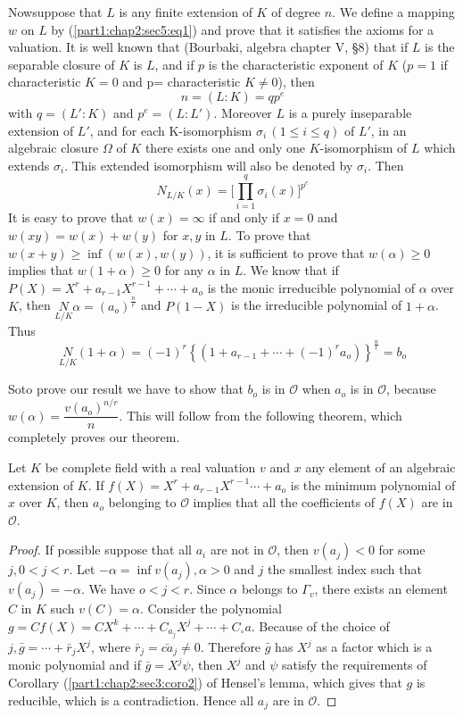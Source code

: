 Now\pageoriginale suppose that $L$ is any finite extension of $K$ of degree $n$. We
define a mapping $w$ on $L$ by (\ref{part1:chap2:sec5:eq1}) and prove that it satisfies the
axioms for a valuation. It is well known that (Bourbaki, algebra
chapter V, \S 8) that if $L$ is the separable closure of $K$ is $L$,
and if $p$ is the characteristic exponent of $K$ (\iec  $p=1$ if
characteristic $K = 0$ and p= characteristic $K \neq 0 $), then 
 $$
n= (L:  K) = q p^e
$$
with $q=(L':  K)$ and $p^e = (L:  L')$. Moreover $L$ is a purely
inseparable extension of $L'$, and for each K-isomorphism $\sigma_i\, (1
\leq i \leq q)$ of $L'$, in an algebraic closure $\Omega$ of $K$ there
exists one and only one $K$-isomorphism of $L$ which extends
$\sigma_i$. This extended isomorphism will also be denoted by
$\sigma_i$. Then 
$$
N_{L/K}(x) =\bigg[\prod\limits^{q}_{i=1} \sigma_i (x) \bigg]^{p^e}
$$
It is easy to prove that $w(x)=\infty$ if and only if $x=0$ and $w(xy)
= w(x) + w(y)$ for $x, y$ in $L$. To prove that $w(x+y) \geq \inf
(w(x), w(y))$, it is sufficient to prove that $w(\alpha ) \geq 0$
implies that $w(1 + \alpha ) \geq 0$ for any $\alpha $ in $L$. We know
that if $P(X) = X^r + a_{r-1}X^{r-1} + \cdots + a_o$ is the monic
irreducible polynomial of $\alpha$ over $K$, then $\underset{L / K} N
\alpha = (a_o)^{\frac{n}{r}}$ and $P(1-X)$ is the irreducible
polynomial of $1+\alpha $. Thus 
$$
\underset{L / K}{N} (1 + \alpha ) = (-1)^r \left\{(1 + a_{r-1} + \cdots +
(-1)^r a_o) \right\}^{\frac {n} {r} } = b_o 
$$

So\pageoriginale to prove our result we have to show that $b_o$ is in
$\mathscr{O}$ 
when $a_o$ is in $\mathscr{O}$, because
$w(\alpha)=\dfrac{v(a_o)^{n/r}}{n}$. This will follow from the
following theorem, which completely proves our theorem. 

\begin{theorem}\label{part1:chap2:sec5:thm2}%
  Let $K$ be complete field with a real valuation $v$ and $x$ any
  element of an algebraic extension of $K$. If $f(X) =X^r
  +a_{r-1}X^{r-1}\cdots+a_o$ is the minimum polynomial of $x$ over
  $K$, then $a_o$ belonging to $\mathscr{O}$ implies that all the
  coefficients of $f(X)$ are in $\mathscr{O}$. 
\end{theorem}

\begin{proof}
  If possible suppose that all $a_i$ are not in $\mathscr{O}$, then
  $v(a_j) < 0$ for some $j, 0 < j < r$. Let $-\alpha = \inf v(a_j),
  \alpha > 0$ and $j$ the smallest index such that $v(a_j) =
  -\alpha$. We have $o < j < r$. Since $\alpha $ belongs to
  $\Gamma_v$, there exists an element $C$ in $K$ such $v(C) =
  \alpha$. Consider the polynomial $g= C f(X) = C X^k+\cdots +C_{a_j}
  X^j + \cdots + C_\circ a$. Because of the choice of $j, \bar{g}=
  \cdots+\bar{r}_j X^j$, where 
  $\bar{r}_j = \bar{ca}_j \neq 0$. Therefore $\bar{g}$ has $X^j$ as a
  factor which is a monic polynomial and if $\bar{g}=X^j \psi$, then
  $X^j$ and $\psi$ satisfy the requirements of Corollary
  (\ref{part1:chap2:sec3:coro2}) of
  Hensel's lemma, which gives that $g$ is reducible, which is a
  contradiction. Hence all $a_j$ are in $\mathscr{O}$. 
\end{proof}

